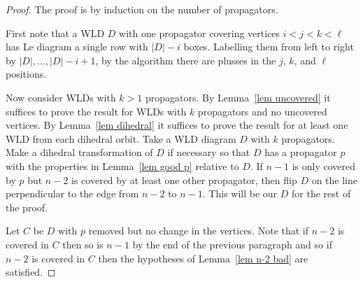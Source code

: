 \documentclass[11pt]{article}
\theoremstyle{remark}
\theoremstyle{definition}
\begin{document}
\begin{proof}
  The proof is by induction on the number of propagators.

  First note that a WLD $D$ with one propagator covering vertices $i<j<k<\ell$ has Le diagram a single row with $|D|-i$ boxes.  Labelling them from left to right by $|D|, \ldots, |D|-i+1$, by the algorithm there are plusses in the $j$, $k$, and $\ell$ positions.

  Now consider WLDs with $k>1$ propagators.  By Lemma~\ref{lem uncovered} it suffices to prove the result for WLDs with $k$ propagators and no uncovered vertices.  By Lemma~\ref{lem dihedral} it suffices to prove the result for at least one WLD from each dihedral orbit.  Take a WLD diagram $D$ with $k$ propagators.  Make a dihedral transformation of $D$ if necessary so that $D$ has a propagator $p$ with the properties in Lemma~\ref{lem good p} relative to $D$.  If $n-1$ is only covered by $p$ but $n-2$ is covered by at least one other propagator, then flip $D$ on the line perpendicular to the edge from $n-2$ to $n-1$.  This will be our $D$ for the rest of the proof.

  Let $C$ be $D$ with $p$ removed but no change in the vertices.  Note that if $n-2$ is covered in $C$ then so is $n-1$ by the end of the previous paragraph and so if $n-2$ is covered in $C$ then the hypotheses of Lemma~\ref{lem n-2 bad} are satisfied.


\end{proof}
\end{document}
